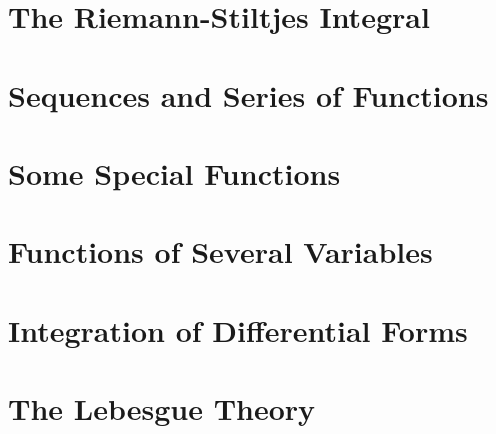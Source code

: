 \documentclass[UTF8]{ctexart}
\theoremstyle{thm}
\theoremstyle{dfn}
\theoremstyle{named}
\begin{document}
\section{The Riemann-Stiltjes Integral}
% 
\newpage

\section{Sequences and Series of Functions}
% 
\newpage

\section{Some Special Functions}
% 
\newpage

\section{Functions of Several Variables}
% 
\newpage

\section{Integration of Differential Forms}
% 
\newpage

\section{The Lebesgue Theory}
% 
\newpage
\end{document}
